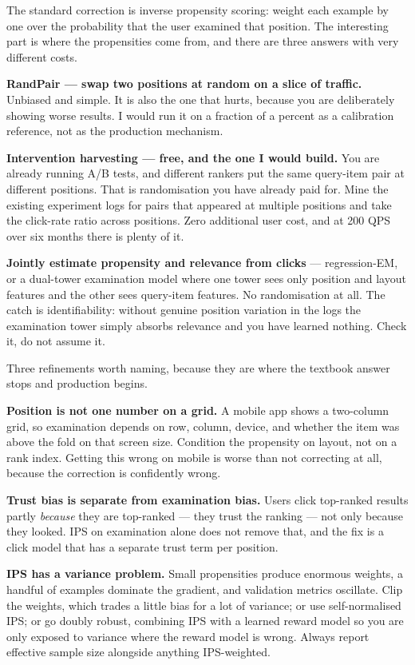 \documentclass[10pt,twoside]{book}
\begin{document}
The standard correction is inverse propensity scoring: weight each example by one over the probability that the user examined that position. The interesting part is where the propensities come from, and there are three answers with very different costs.\par
\textbf{RandPair --- swap two positions at random on a slice of traffic.} Unbiased and simple. It is also the one that hurts, because you are deliberately showing worse results. I would run it on a fraction of a percent as a calibration reference, not as the production mechanism.\par
\textbf{Intervention harvesting --- free, and the one I would build.} You are already running A/B tests, and different rankers put the same query-item pair at different positions. That is randomisation you have already paid for. Mine the existing experiment logs for pairs that appeared at multiple positions and take the click-rate ratio across positions. Zero additional user cost, and at 200 QPS over six months there is plenty of it.\par
\textbf{Jointly estimate propensity and relevance from clicks} --- regression-EM, or a dual-tower examination model where one tower sees only position and layout features and the other sees query-item features. No randomisation at all. The catch is identifiability: without genuine position variation in the logs the examination tower simply absorbs relevance and you have learned nothing. Check it, do not assume it.\par
Three refinements worth naming, because they are where the textbook answer stops and production begins.\par
\textbf{Position is not one number on a grid.} A mobile app shows a two-column grid, so examination depends on row, column, device, and whether the item was above the fold on that screen size. Condition the propensity on layout, not on a rank index. Getting this wrong on mobile is worse than not correcting at all, because the correction is confidently wrong.\par
\textbf{Trust bias is separate from examination bias.} Users click top-ranked results partly \textit{because} they are top-ranked --- they trust the ranking --- not only because they looked. IPS on examination alone does not remove that, and the fix is a click model that has a separate trust term per position.\par
\textbf{IPS has a variance problem.} Small propensities produce enormous weights, a handful of examples dominate the gradient, and validation metrics oscillate. Clip the weights, which trades a little bias for a lot of variance; or use self-normalised IPS; or go doubly robust, combining IPS with a learned reward model so you are only exposed to variance where the reward model is wrong. Always report effective sample size alongside anything IPS-weighted.\par
\end{document}
